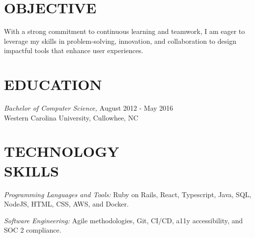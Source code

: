 \documentclass[margin, 10pt]{res} %
\begin{document}
\begin{resume}

 
\section{OBJECTIVE}  

With a strong commitment to continuous learning and teamwork, I am eager to leverage my skills in problem-solving, innovation, and collaboration to design impactful tools that enhance user experiences.


\section{EDUCATION}

{\sl Bachelor of Computer Science,}  \hfill August 2012 - May 2016 \\
Western Carolina University, Cullowhee, NC\\
 

\section{TECHNOLOGY \\ SKILLS} 

{\sl Programming Languages and Tools:} Ruby on Rails, React, Typescript, Java, SQL, NodeJS, HTML, CSS, AWS, and Docker. 

{\sl Software Engineering:} Agile methodologies, Git, CI/CD, a11y accessibility, and SOC 2 compliance. \\
 
 

\end{resume}
\end{document}
